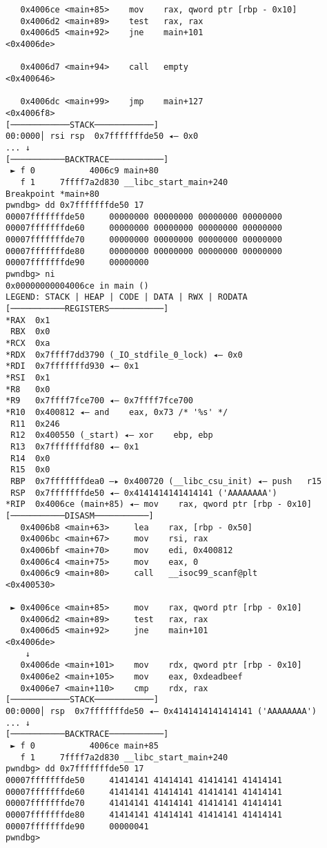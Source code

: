 \begin{lstlisting}
   0x4006ce <main+85>    mov    rax, qword ptr [rbp - 0x10]
   0x4006d2 <main+89>    test   rax, rax
   0x4006d5 <main+92>    jne    main+101                      <0x4006de>
 
   0x4006d7 <main+94>    call   empty                         <0x400646>
 
   0x4006dc <main+99>    jmp    main+127                      <0x4006f8>
[────────────STACK────────────]
00:0000│ rsi rsp  0x7fffffffde50 ◂— 0x0
... ↓
[───────────BACKTRACE───────────]
 ► f 0           4006c9 main+80
   f 1     7ffff7a2d830 __libc_start_main+240
Breakpoint *main+80
pwndbg> dd 0x7fffffffde50 17
00007fffffffde50     00000000 00000000 00000000 00000000
00007fffffffde60     00000000 00000000 00000000 00000000
00007fffffffde70     00000000 00000000 00000000 00000000
00007fffffffde80     00000000 00000000 00000000 00000000
00007fffffffde90     00000000
pwndbg> ni
0x00000000004006ce in main ()
LEGEND: STACK | HEAP | CODE | DATA | RWX | RODATA
[───────────REGISTERS───────────]
*RAX  0x1
 RBX  0x0
*RCX  0xa
*RDX  0x7ffff7dd3790 (_IO_stdfile_0_lock) ◂— 0x0
*RDI  0x7fffffffd930 ◂— 0x1
*RSI  0x1
*R8   0x0
*R9   0x7ffff7fce700 ◂— 0x7ffff7fce700
*R10  0x400812 ◂— and    eax, 0x73 /* '%s' */
 R11  0x246
 R12  0x400550 (_start) ◂— xor    ebp, ebp
 R13  0x7fffffffdf80 ◂— 0x1
 R14  0x0
 R15  0x0
 RBP  0x7fffffffdea0 —▸ 0x400720 (__libc_csu_init) ◂— push   r15
 RSP  0x7fffffffde50 ◂— 0x4141414141414141 ('AAAAAAAA')
*RIP  0x4006ce (main+85) ◂— mov    rax, qword ptr [rbp - 0x10]
[───────────DISASM───────────]
   0x4006b8 <main+63>     lea    rax, [rbp - 0x50]
   0x4006bc <main+67>     mov    rsi, rax
   0x4006bf <main+70>     mov    edi, 0x400812
   0x4006c4 <main+75>     mov    eax, 0
   0x4006c9 <main+80>     call   __isoc99_scanf@plt            <0x400530>
 
 ► 0x4006ce <main+85>     mov    rax, qword ptr [rbp - 0x10]
   0x4006d2 <main+89>     test   rax, rax
   0x4006d5 <main+92>     jne    main+101                      <0x4006de>
    ↓
   0x4006de <main+101>    mov    rdx, qword ptr [rbp - 0x10]
   0x4006e2 <main+105>    mov    eax, 0xdeadbeef
   0x4006e7 <main+110>    cmp    rdx, rax
[────────────STACK────────────]
00:0000│ rsp  0x7fffffffde50 ◂— 0x4141414141414141 ('AAAAAAAA')
... ↓
[───────────BACKTRACE───────────]
 ► f 0           4006ce main+85
   f 1     7ffff7a2d830 __libc_start_main+240
pwndbg> dd 0x7fffffffde50 17
00007fffffffde50     41414141 41414141 41414141 41414141
00007fffffffde60     41414141 41414141 41414141 41414141
00007fffffffde70     41414141 41414141 41414141 41414141
00007fffffffde80     41414141 41414141 41414141 41414141
00007fffffffde90     00000041
pwndbg> 
\end{lstlisting}

